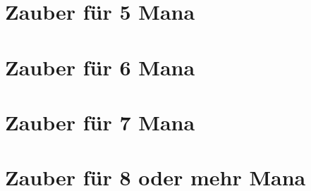 \zaubertabelle

\section{Zauber für 5 Mana}

\zaubertabelle

\section{Zauber für 6 Mana}

\zaubertabelle

\section{Zauber für 7 Mana}

\zaubertabelle

\section{Zauber für 8 oder mehr Mana}

\zaubertabelle

\let\zaubertabelle\relax
